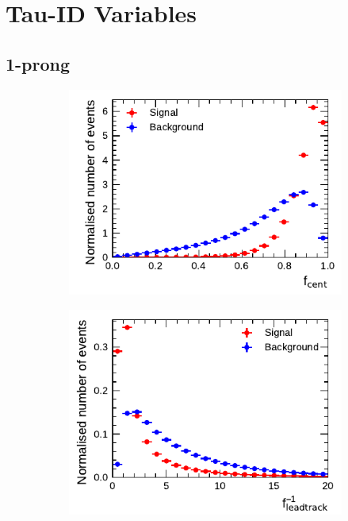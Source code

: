 \clearpage
\section{Tau-ID Variables}

\subsection{1-prong}
\begin{figure}[!ht]
  \begin{subfigure}{0.5\textwidth}
    \centering
    \includegraphics{./figures/baseline_bdt_vars/1p/centFrac.pdf}
  \end{subfigure}%
  \begin{subfigure}{0.5\textwidth}
    \centering
    \includegraphics{./figures/baseline_bdt_vars/1p/etOverPtLeadTrk.pdf}
  \end{subfigure}

\end{figure}
